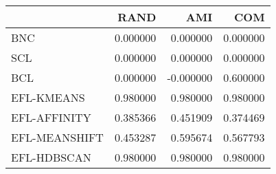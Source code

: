 \begin{tabular}{lrrr}
\toprule
 & RAND & AMI & COM \\
\midrule
BNC & 0.000000 & 0.000000 & 0.000000 \\
SCL & 0.000000 & 0.000000 & 0.000000 \\
BCL & 0.000000 & -0.000000 & 0.600000 \\
EFL-KMEANS & 0.980000 & 0.980000 & 0.980000 \\
EFL-AFFINITY & 0.385366 & 0.451909 & 0.374469 \\
EFL-MEANSHIFT & 0.453287 & 0.595674 & 0.567793 \\
EFL-HDBSCAN & 0.980000 & 0.980000 & 0.980000 \\
\bottomrule
\end{tabular}
